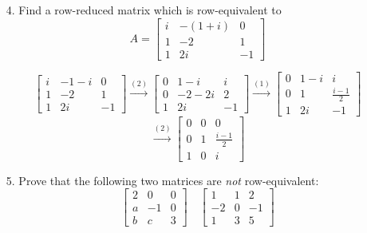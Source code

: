 \documentclass{article}
\begin{document}
\begin{enumerate}[listparindent=\parindent]
\item[4.] Find a row-reduced matrix which is row-equivalent to
    \[
        A = \begin{bmatrix}
            i & -(1 + i) & 0 \\
            1 & -2 & 1 \\
            1 & 2i & -1
        \end{bmatrix}
    \]

\[
    \begin{bmatrix}
        i & -1 - i & 0 \\
        1 & -2 & 1 \\
        1 & 2i & -1
    \end{bmatrix}
    \xrightarrow{(2)}
    \begin{bmatrix}
        0 & 1 - i & i \\
        0 & -2-2i & 2 \\
        1 & 2i & -1
    \end{bmatrix}
    \xrightarrow{(1)}
    \begin{bmatrix}
        0 & 1 - i & i \\
        0 & 1 & \frac{i - 1}{2} \\
        1 & 2i & -1
    \end{bmatrix}
\]
\[
    \xrightarrow{(2)}
    \boxed{
        \begin{bmatrix}
            0 & 0 & 0 \\
            0 & 1 & \frac{i - 1}{2} \\
            1 & 0 & i
        \end{bmatrix}
    }
\]

\item[5.] Prove that the following two matrices are \textit{not} row-equivalent:
    \[
        \begin{bmatrix}
            2 & 0 & 0 \\
            a & -1 & 0 \\
            b & c & 3
        \end{bmatrix}
        \quad
        \begin{bmatrix}
            1 & 1 & 2 \\
            -2 & 0 & -1 \\
            1 & 3 & 5
        \end{bmatrix}
    \]


\end{enumerate}
\end{document}
